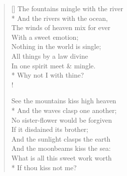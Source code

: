 \documentclass[MAIN]{subfiles}
\begin{document}
\settowidth{\versewidth}{The fountains mingle with the river}
\begin{verse}[\versewidth]
The fountains mingle with the river\\*
\vin And the rivers with the ocean,\\
The winds of heaven mix for ever\\
\vin With a sweet emotion;\\
Nothing in the world is single;\\
\vin All things by a law divine\\
In one spirit meet \& mingle.\\*
\vin Why not I with thine?\\!

See the mountains kiss high heaven\\*
\vin And the waves clasp one another;\\
No sister-flower would be forgiven\\
\vin If it disdained its brother;\\
And the sunlight clasps the earth\\
\vin And the moonbeams kiss the sea:\\
What is all this sweet work worth\\*
\vin If thou kiss not me?
\end{verse}
\end{document}
